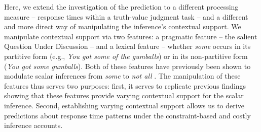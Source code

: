 \documentclass[10pt,letterpaper]{article}
\begin{document}
Here, we extend the investigation of the prediction to a different processing measure -- response times within a truth-value judgment task -- and a different and more direct way of manipulating the inference's contextual support. We manipulate contextual support via two features: a pragmatic feature -- the salient Question Under Discussion \cite<QUD, >{Roberts2012} -- and a lexical feature -- whether  \emph{some} occurs in its partitive form (e.g., \emph{You got some of the gumballs}) or in its non-partitive form (\emph{You got some gumballs}). Both of these features have previously been shown to modulate scalar inferences from \emph{some} to \emph{not all} \cite{Zondervan2010, DegenGoodman2014, Degen2015, DegenTanenhaus2015}. The manipulation of these features thus serves two purposes: first, it serves to replicate previous findings showing that these features provide varying contextual support for the scalar inference. Second, establishing varying contextual support allows us to derive predictions about response time patterns under the constraint-based and costly inference accounts.




\end{document}
